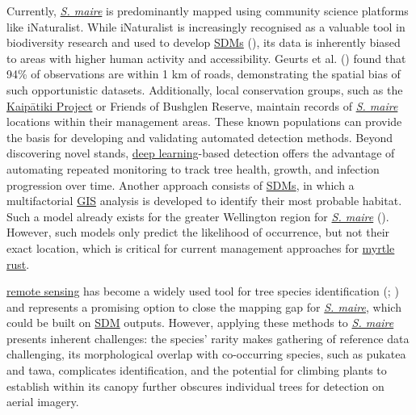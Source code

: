\documentclass[
]{scrreprt}
\begin{document}
Currently, \hyperref[acronyms_SM]{\emph{S. maire}} is predominantly
mapped using community science platforms like iNaturalist. While
iNaturalist is increasingly recognised as a valuable tool in
biodiversity research and used to develop \hyperref[acronyms_SDM]{SDMs}
(),
its data is inherently biased to areas with higher human activity and
accessibility. Geurts et al.
() found that 94\% of
observations are within 1 km of roads, demonstrating the spatial bias of
such opportunistic datasets. Additionally, local conservation groups,
such as the
\href{https://kaipatiki.org.nz/our-work/eskdale-reserve/}{Kaipātiki
Project} or Friends of Bushglen Reserve, maintain records of
\hyperref[acronyms_SM]{\emph{S. maire}} locations within their
management areas. These known populations can provide the basis for
developing and validating automated detection methods. Beyond
discovering novel stands, \hyperref[acronyms_DL]{deep learning}-based
detection offers the advantage of automating repeated monitoring to
track tree health, growth, and infection progression over time. Another
approach consists of \hyperref[acronyms_SDM]{SDMs}, in which a
multifactorial \hyperref[acronyms_GIS]{GIS} analysis is developed to
identify their most probable habitat. Such a model already exists for
the greater Wellington region for \hyperref[acronyms_SM]{\emph{S.
maire}} (). However, such models only predict the likelihood of
occurrence, but not their exact location, which is critical for current
management approaches for \hyperref[acronyms_MR]{myrtle rust}.

\hyperref[acronyms_RS]{remote sensing} has become a widely used tool for
tree species identification
(;
) and
represents a promising option to close the mapping gap for
\hyperref[acronyms_SM]{\emph{S. maire}}, which could be built on
\hyperref[acronyms_SDM]{SDM} outputs. However, applying these methods to
\hyperref[acronyms_SM]{\emph{S. maire}} presents inherent challenges:
the species' rarity makes gathering of reference data challenging, its
morphological overlap with co-occurring species, such as pukatea and
tawa, complicates identification, and the potential for climbing plants
to establish within its canopy further obscures individual trees for
detection on aerial imagery.
\end{document}
